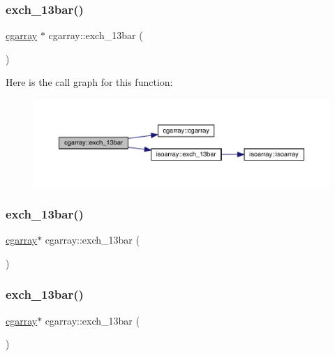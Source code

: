\subsubsection{\texorpdfstring{exch\_13bar()}{exch\_13bar()}\hspace{0.1cm}{\footnotesize\ttfamily [1/3]}}
{\footnotesize\ttfamily \mbox{\hyperlink{classcgarray}{cgarray}} $\ast$ cgarray\+::exch\+\_\+13bar (\begin{DoxyParamCaption}{ }\end{DoxyParamCaption})}

Here is the call graph for this function\+:
\nopagebreak
\begin{figure}[H]
\begin{center}
\leavevmode
\includegraphics[width=350pt]{d7/d55/classcgarray_a961a09e4792a1e3b9b9c7ac10f02bc1b_cgraph}
\end{center}
\end{figure}
\mbox{\label{classcgarray_af08670dc7c69194e4f7ace902daac0bf}} 
\subsubsection{\texorpdfstring{exch\_13bar()}{exch\_13bar()}\hspace{0.1cm}{\footnotesize\ttfamily [2/3]}}
{\footnotesize\ttfamily \mbox{\hyperlink{classcgarray}{cgarray}}$\ast$ cgarray\+::exch\+\_\+13bar (\begin{DoxyParamCaption}{ }\end{DoxyParamCaption})}

\mbox{\label{classcgarray_af08670dc7c69194e4f7ace902daac0bf}} 
\subsubsection{\texorpdfstring{exch\_13bar()}{exch\_13bar()}\hspace{0.1cm}{\footnotesize\ttfamily [3/3]}}
{\footnotesize\ttfamily \mbox{\hyperlink{classcgarray}{cgarray}}$\ast$ cgarray\+::exch\+\_\+13bar (\begin{DoxyParamCaption}{ }\end{DoxyParamCaption})}


